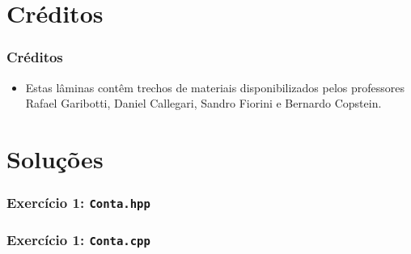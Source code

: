 \documentclass[aspectratio=169]{beamer}
\begin{document}
\section{Créditos}

\begin{frame}\frametitle{Créditos}
\begin{itemize}
	\item Estas lâminas contêm trechos de materiais disponibilizados pelos professores Rafael Garibotti, Daniel Callegari, Sandro Fiorini e Bernardo Copstein.
\end{itemize}
\end{frame}

\section{Soluções}

\begin{frame}[fragile]\frametitle{Exercício 1: \texttt{Conta.hpp}}
\fontsize{6pt}{6pt}\selectfont{

}
\end{frame}

\begin{frame}[fragile]\frametitle{Exercício 1: \texttt{Conta.cpp}}
\fontsize{5pt}{5pt}\selectfont{

}
\end{frame}

\end{document}
